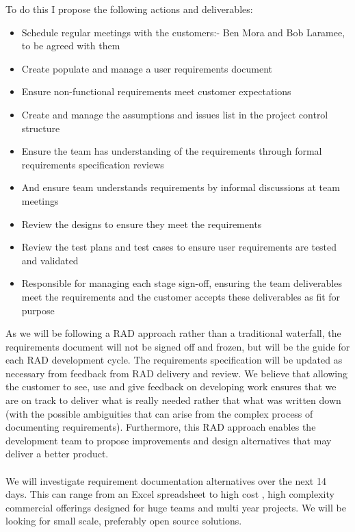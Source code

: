 \documentclass{article}
\begin{document}
To do this I propose the following actions and deliverables:
\begin{itemize}
\item Schedule regular meetings with the customers:- Ben Mora and Bob Laramee, to be agreed with them
\item Create populate and manage a user requirements document
\item Ensure non-functional requirements meet customer expectations
\item Create and manage the assumptions and issues list in the project control structure
\item Ensure the team has understanding of the requirements through formal requirements specification reviews
\item And ensure team understands requirements by informal discussions at team meetings
\item Review the designs to ensure they meet the requirements
\item Review the test plans and test cases to ensure user requirements are tested and validated
\item Responsible for managing each stage sign-off, ensuring the team deliverables meet the requirements and the customer accepts these deliverables as fit for purpose
\end{itemize}
As we will be following a RAD approach rather than a traditional waterfall, the requirements document will not be signed off and frozen, but will be the guide for each RAD development cycle. The requirements specification will be updated as necessary from feedback from RAD delivery and review. We believe that allowing the customer to see, use and give feedback on developing work ensures that we are on track to deliver what is really needed rather that what was written down (with the possible ambiguities that can arise from the complex process of documenting requirements). Furthermore, this RAD approach enables the development team to propose improvements and design alternatives that may deliver a better product.
\\
\\
We will investigate  requirement documentation alternatives over the next 14 days. This can range from an Excel spreadsheet to high cost , high complexity commercial offerings designed for huge teams and multi year projects. We will be looking for small scale, preferably open source solutions. 
\newpage
\end{document}
